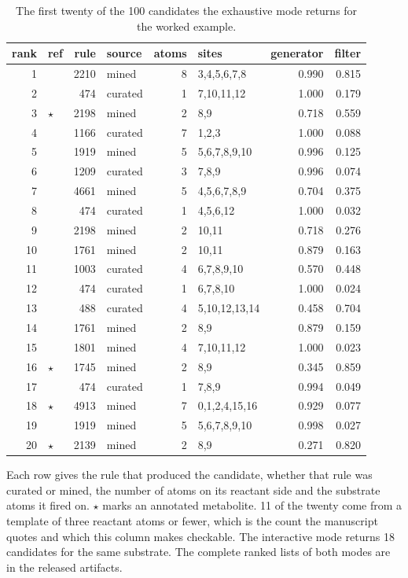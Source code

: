 \begin{table}[h]
\centering\footnotesize
\begin{threeparttable}
\caption{The first twenty of the 100 candidates the exhaustive mode returns for the worked example.}
\label{tab:si-case}
\begin{tabular}{rlrlrlrr}
\toprule
rank & ref & rule & source & atoms & sites & generator & filter \\
\midrule
1 &  & 2210 & mined & 8 & 3,4,5,6,7,8 & 0.990 & 0.815 \\
2 &  & 474 & curated & 1 & 7,10,11,12 & 1.000 & 0.179 \\
3 & $\star$ & 2198 & mined & 2 & 8,9 & 0.718 & 0.559 \\
4 &  & 1166 & curated & 7 & 1,2,3 & 1.000 & 0.088 \\
5 &  & 1919 & mined & 5 & 5,6,7,8,9,10 & 0.996 & 0.125 \\
6 &  & 1209 & curated & 3 & 7,8,9 & 0.996 & 0.074 \\
7 &  & 4661 & mined & 5 & 4,5,6,7,8,9 & 0.704 & 0.375 \\
8 &  & 474 & curated & 1 & 4,5,6,12 & 1.000 & 0.032 \\
9 &  & 2198 & mined & 2 & 10,11 & 0.718 & 0.276 \\
10 &  & 1761 & mined & 2 & 10,11 & 0.879 & 0.163 \\
11 &  & 1003 & curated & 4 & 6,7,8,9,10 & 0.570 & 0.448 \\
12 &  & 474 & curated & 1 & 6,7,8,10 & 1.000 & 0.024 \\
13 &  & 488 & curated & 4 & 5,10,12,13,14 & 0.458 & 0.704 \\
14 &  & 1761 & mined & 2 & 8,9 & 0.879 & 0.159 \\
15 &  & 1801 & mined & 4 & 7,10,11,12 & 1.000 & 0.023 \\
16 & $\star$ & 1745 & mined & 2 & 8,9 & 0.345 & 0.859 \\
17 &  & 474 & curated & 1 & 7,8,9 & 0.994 & 0.049 \\
18 & $\star$ & 4913 & mined & 7 & 0,1,2,4,15,16 & 0.929 & 0.077 \\
19 &  & 1919 & mined & 5 & 5,6,7,8,9,10 & 0.998 & 0.027 \\
20 & $\star$ & 2139 & mined & 2 & 8,9 & 0.271 & 0.820 \\
\bottomrule
\end{tabular}
\begin{tablenotes}[flushleft]\footnotesize
\item Each row gives the rule that produced the candidate, whether that rule was curated or mined, the number of atoms on its reactant side and the substrate atoms it fired on. $\star$ marks an annotated metabolite. 11 of the twenty come from a template of three reactant atoms or fewer, which is the count the manuscript quotes and which this column makes checkable. The interactive mode returns 18 candidates for the same substrate. The complete ranked lists of both modes are in the released artifacts.
\end{tablenotes}
\end{threeparttable}
\end{table}
